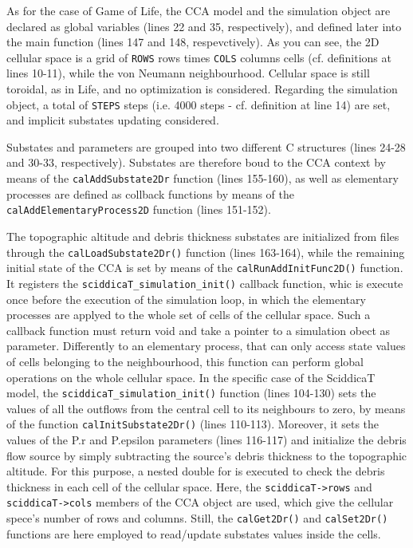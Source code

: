 

As for the case of Game of Life, the CCA model and the simulation
object are declared as global variables (lines 22 and 35,
respectively), and defined later into the main function (lines 147 and
148, respevctively). As you can see, the 2D cellular space is a grid
of \verb'ROWS' rows times \verb'COLS' columns cells (cf. definitions
at lines 10-11), while the von Neumann neighbourhood. Cellular space
is still toroidal, as in Life, and no optimization is considered. Regarding the simulation object, a total of \verb'STEPS' steps
(i.e. 4000 steps - cf. definition at line 14) are set, and implicit substates updating considered.

Substates and parameters are grouped into two different C structures
(lines 24-28 and 30-33, respectively). Substates are therefore boud to
the CCA context by means of the \verb'calAddSubstate2Dr' function
(lines 155-160), as well as elementary processes are defined as
collback functions by means of the \verb'calAddElementaryProcess2D'
function (lines 151-152).

The topographic altitude and debris thickness substates are
initialized from files through the \verb'calLoadSubstate2Dr()'
function (lines 163-164), while the remaining initial state of the CCA
is set by means of the \verb'calRunAddInitFunc2D()' function. It
registers the \verb'sciddicaT_simulation_init()' callback function,
whic is execute once before the execution of the simulation loop, in
which the elementary processes are applyed to the whole set of cells
of the cellular space. Such a callback function must return void and
take a pointer to a simulation obect as parameter. Differently to an
elementary process, that can only access state values of cells
belonging to the neighbourhood, this function can perform global
operations on the whole cellular space. In the specific case of the
SciddicaT model, the \verb'sciddicaT_simulation_init()' function
(lines 104-130) sets the values of all the outflows from the central
cell to its neighbours to zero, by means of the function
\verb'calInitSubstate2Dr()' (lines 110-113). Moreover, it sets the
values of the P.r and P.epsilon parameters (lines 116-117) and
initialize the debris flow source by simply subtracting the source's
debris thickness to the topographic altitude. For this purpose, a
nested double for is executed to check the debris thickness in each
cell of the cellular space. Here, the \verb'sciddicaT->rows' and
\verb'sciddicaT->cols' members of the CCA object are used, which give
the cellular spece's number of rows and columns. Still, the
\verb'calGet2Dr()' and \verb'calSet2Dr()' functions are here employed to
read/update substates values inside the cells.

